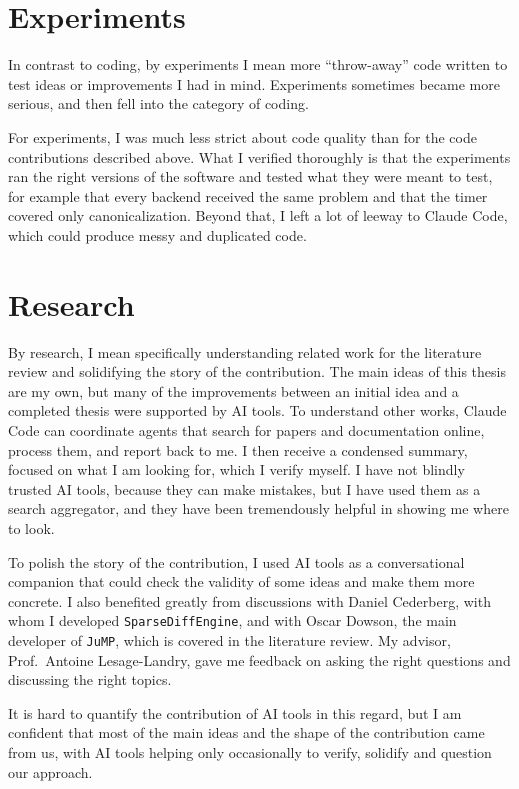 \section*{Experiments}

In contrast to coding, by experiments I mean more ``throw-away'' code written to test ideas or
improvements I had in mind. Experiments sometimes became more serious, and then fell into the
category of coding.

For experiments, I was much less strict about code quality than for the code contributions
described above. What I verified thoroughly is that the experiments ran the right versions of the
software and tested what they were meant to test, for example that every backend received the
same problem and that the timer covered only canonicalization. Beyond that, I left a lot of leeway to Claude Code, which could produce messy
and duplicated code.

\section*{Research}

By research, I mean specifically understanding related work for the literature review and
solidifying the story of the contribution. The main ideas of this thesis are my own, but many
of the improvements between an initial idea and a completed thesis were supported by AI tools.
To understand other works, Claude Code can coordinate agents that search for papers and
documentation online, process them, and report back to me. I then receive a condensed summary,
focused on what I am looking for, which I verify myself. I have not blindly trusted AI tools,
because they can make mistakes, but I have used them as a search aggregator, and they have been
tremendously helpful in showing me where to look.

To polish the story of the contribution, I used AI tools as a conversational companion that
could check the validity of some ideas and make them more concrete. I also benefited greatly
from discussions with Daniel Cederberg, with whom I developed \texttt{SparseDiffEngine}, and
with Oscar Dowson, the main developer of \texttt{JuMP}, which is covered in the literature
review. My advisor, Prof.\ Antoine Lesage-Landry, gave me feedback on asking the right questions
and discussing the right topics.

It is hard to quantify the contribution of AI tools in this regard, but I am confident that
most of the main ideas and the shape of the contribution came from us, with AI tools helping
only occasionally to verify, solidify and question our approach.

